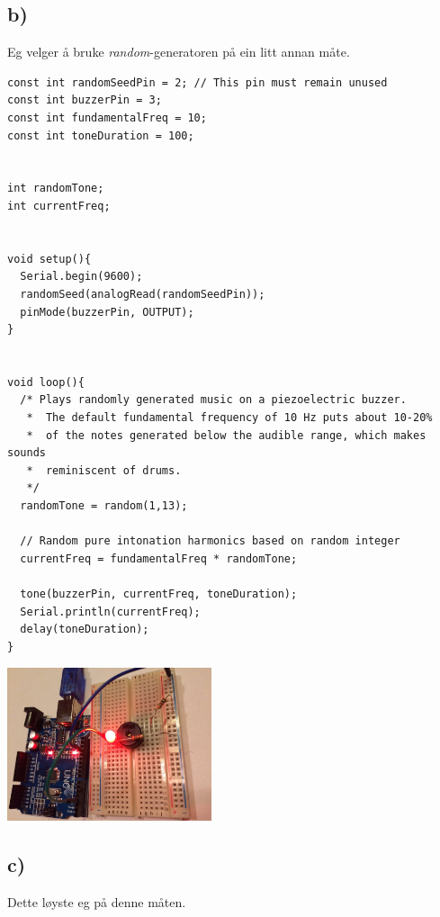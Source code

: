 \documentclass[12pt,a4paper]{article}
\begin{document}
    \subsection*{b)}
    Eg velger å bruke \textit{random}-generatoren på ein litt annan måte.
    \begin{lstlisting}[language=Arduino, basicstyle=\tiny]
const int randomSeedPin = 2; // This pin must remain unused
const int buzzerPin = 3;
const int fundamentalFreq = 10;
const int toneDuration = 100;


int randomTone;
int currentFreq;


void setup(){
  Serial.begin(9600);  
  randomSeed(analogRead(randomSeedPin));
  pinMode(buzzerPin, OUTPUT);
}


void loop(){
  /* Plays randomly generated music on a piezoelectric buzzer.
   *  The default fundamental frequency of 10 Hz puts about 10-20%
   *  of the notes generated below the audible range, which makes sounds
   *  reminiscent of drums.
   */
  randomTone = random(1,13);

  // Random pure intonation harmonics based on random integer
  currentFreq = fundamentalFreq * randomTone;

  tone(buzzerPin, currentFreq, toneDuration);
  Serial.println(currentFreq);
  delay(toneDuration);
}
    \end{lstlisting}
    \begin{center}
      \includegraphics[width=170pt]{02_4_b.png}
    \end{center}

    \subsection*{c)}
    Dette løyste eg på denne måten.
\end{document}
